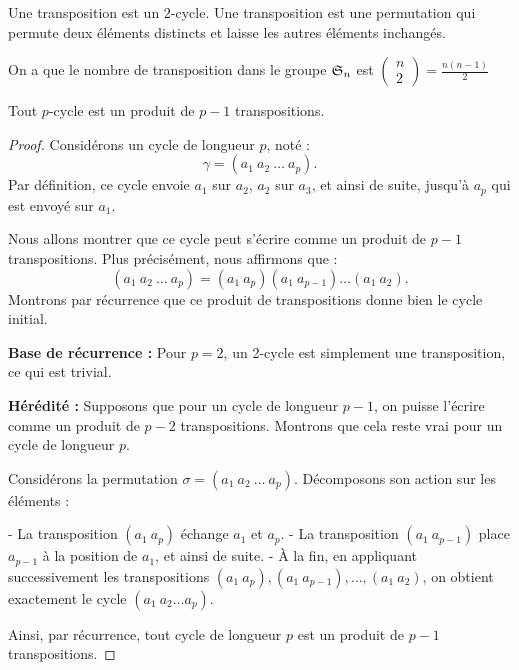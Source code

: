 \begin{definition}
    Une transposition est un $2$-cycle. Une transposition est une permutation qui permute deux éléments distincts et laisse les autres éléments inchangés.
\end{definition}

\begin{remarque}
    On a que le nombre de transposition dans le groupe $\mathfrak{S}_n$ est $\begin{pmatrix}
        n\\2
    \end{pmatrix}=\frac{n(n-1)}{2}$
\end{remarque}

\begin{proposition}
        Tout $p$-cycle est un produit de $p-1$ transpositions.
    \end{proposition}

\begin{proof}

Considérons un cycle de longueur \( p \), noté :
\[
\gamma = (a_1 \ a_2 \ \dots \ a_p).
\]
Par définition, ce cycle envoie \( a_1 \) sur \( a_2 \), \( a_2 \) sur \( a_3 \), et ainsi de suite, jusqu’à \( a_p \) qui est envoyé sur \( a_1 \).

Nous allons montrer que ce cycle peut s’écrire comme un produit de \( p-1 \) transpositions. Plus précisément, nous affirmons que :
\[
(a_1 \ a_2 \ \dots \ a_p) = (a_1 \ a_p)(a_1 \ a_{p-1}) \dots (a_1 \ a_2).
\]
Montrons par récurrence que ce produit de transpositions donne bien le cycle initial.

\textbf{Base de récurrence :}  
Pour \( p = 2 \), un 2-cycle est simplement une transposition, ce qui est trivial.

\textbf{Hérédité :}  
Supposons que pour un cycle de longueur \( p-1 \), on puisse l’écrire comme un produit de \( p-2 \) transpositions. Montrons que cela reste vrai pour un cycle de longueur \( p \).

Considérons la permutation \(\sigma = (a_1 \ a_2 \ \dots \ a_p)\). Décomposons son action sur les éléments :

- La transposition \( (a_1 \ a_p) \) échange \( a_1 \) et \( a_p \).
- La transposition \( (a_1 \ a_{p-1}) \) place \( a_{p-1} \) à la position de \( a_1 \), et ainsi de suite.
- À la fin, en appliquant successivement les transpositions \( (a_1 \ a_p), (a_1 \ a_{p-1}), \dots, (a_1 \ a_2) \), on obtient exactement le cycle \( (a_1 \ a_2 \dots a_p) \).

Ainsi, par récurrence, tout cycle de longueur \( p \) est un produit de \( p-1 \) transpositions.

\end{proof}

